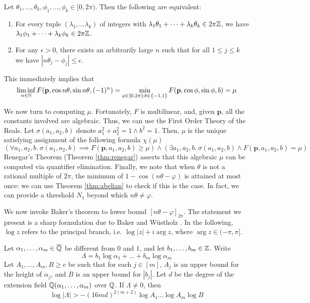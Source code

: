  \begin{theorem}
  \label{thm:kronecker}
  Let $\theta_1, ... , \theta_k, \phi_1, ... , \phi_k \in [0, 2\pi)$. Then the following are equivalent:
  \begin{enumerate}
\item For every tuple $(\lambda_1,...\lambda_k)$ of integers with 
    $\lambda_1 \theta_1 + \cdots +  \lambda_k \theta_k \in 2\pi\mathbb{Z}$, 
  we have \\$\lambda_1 \phi_1 + \cdots + \lambda_k \phi_k \in 2\pi\mathbb{Z}$.
  \item For any $\epsilon > 0$, there exists an arbitrarily large $n$ such that for all 
    $1 \le j \le k$ we have $| n \theta_j - \phi_j| \le \epsilon$.
    \end{enumerate}
  \end{theorem}
  
This immediately implies that
\begin{equation}
\liminf_{n \in \mathbb{N}} F(\mathbf{p}, \cos n\theta, \sin n\theta, (-1)^n) = \min_{\phi \in [0, 2\pi); b\in\{-1, 1\}} F(\mathbf{p}, \cos \phi, \sin \phi, b) = \mu
\end{equation}

We now turn to computing $\mu$. Fortunately, $F$ is multilinear, and, given $\mathbf{p}$, all the constants involved are algebraic. Thus, we can use the First Order Theory of the Reals. Let $\sigma(a_1, a_2, b)$ denote $a_1^2 + a_2^2 = 1 \land b^2 =1$. Then, $\mu$ is the unique satisfying assignment of the following formula $\chi(\mu)$
$$
(\forall a_1, a_2, b.~ \sigma(a_1, a_2, b) \implies F(\mathbf{p}, a_1, a_2, b) \ge \mu) \land (\exists a_1, a_2, b.~ \sigma(a_1, a_2, b) \land F(\mathbf{p}, a_1, a_2, b) = \mu)
$$
Renegar's Theorem (Theorem \ref{thm:renegar}) asserts that this algebraic $\mu$ can be computed via quantifier elimination. Finally, we note that when $\theta$ is not a rational multiple of $2\pi$, the minimum of $1 - \cos(n\theta - \varphi)$ is attained at most once: we can use Theorem \ref{thm:abelian} to check if this is the case. In fact, we can provide a threshold $N_1$ beyond which $n\theta \ne \varphi$. 

We now invoke Baker's theorem to lower bound $[n\theta - \varphi]_{2\pi}$. The statement we present is a sharp formulation due to Baker and W{\"u}stholz \cite{baker}. In the following, $\log z$ refers to the principal branch, i.e. $\log |z| + i \arg z$, where $\arg z \in (-\pi, \pi]$.

\begin{theorem}[Baker]
\label{thm:baker}
Let $\alpha_1, \dots, \alpha_m \in \overline{\mathbb{Q}}$ be different from $0$ and $1$, and let $b_1, \dots, b_m \in \mathbb{Z}$. Write
$$
\Lambda = b_1 \log \alpha_1 + \dots + b_m \log \alpha_m
$$
Let $A_1, \dots, A_m, B \ge e$ be such that for each $j \in [m]$, $A_j$ is an upper bound for the height of $\alpha_j$, and $B$ is an upper bound for $|b_j|$. Let $d$ be the degree of the extension field $\mathbb{Q}(\alpha_1, \dots, \alpha_m)$ over $\mathbb{Q}$. If $\Lambda \ne 0$, then
$$
\log |\Lambda| > -(16md)^{2(m+2)}\log A_1 \dots \log A_m \log B
$$  
\end{theorem}

